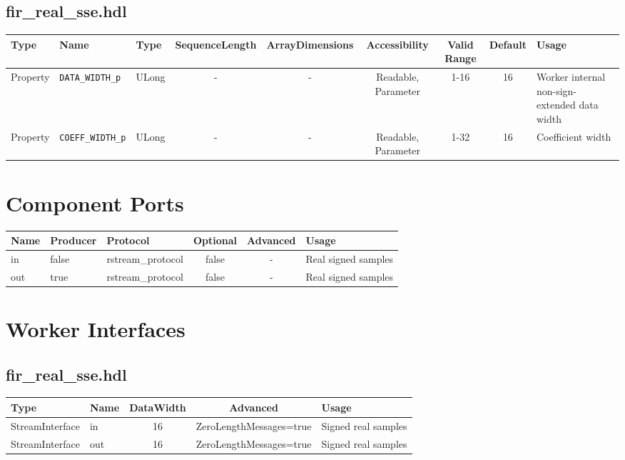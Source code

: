 \documentclass{article}
\def\comp{fir\_real\_sse}
\begin{document}
\begin{landscape}
	\subsection*{\comp.hdl}
	\begin{scriptsize}
		\begin{tabular}{|p{3cm}|p{2cm}|p{1cm}|c|c|c|c|c|p{5cm}|}
			\hline
			\rowcolor{blue}
			Type     & Name                 & Type  & SequenceLength & ArrayDimensions & Accessibility       & Valid Range & Default & Usage                                        \\
			\hline
			Property & \verb+DATA_WIDTH_p+  & ULong & -              & -               & Readable, Parameter & 1-16        & 16      & Worker internal non-sign-extended data width \\
			\hline
			Property & \verb+COEFF_WIDTH_p+ & ULong & -              & -               & Readable, Parameter & 1-32        & 16      & Coefficient width                            \\
			\hline
		\end{tabular}
	\end{scriptsize}

	\section*{Component Ports}
	\begin{scriptsize}
		\begin{tabular}{|M{2cm}|M{1.5cm}|M{4cm}|c|c|M{9cm}|}
			\hline
			\rowcolor{blue}
			Name & Producer & Protocol          & Optional & Advanced & Usage               \\
			\hline
			in   & false    & rstream\_protocol & false    & -        & Real signed samples \\
			\hline
			out  & true     & rstream\_protocol & false    & -        & Real signed samples \\
			\hline
		\end{tabular}
	\end{scriptsize}

	\section*{Worker Interfaces}
	\subsection*{\comp.hdl}
	\begin{scriptsize}
		\begin{tabular}{|M{2cm}|M{1.5cm}|c|c|M{12cm}|}
			\hline
			Type            & Name & DataWidth & Advanced                & Usage               \\
			\hline
			StreamInterface & in   & 16        & ZeroLengthMessages=true & Signed real samples \\
			\hline
			StreamInterface & out  & 16        & ZeroLengthMessages=true & Signed real samples \\
			\hline
		\end{tabular}
	\end{scriptsize}
\end{landscape}
\end{document}
